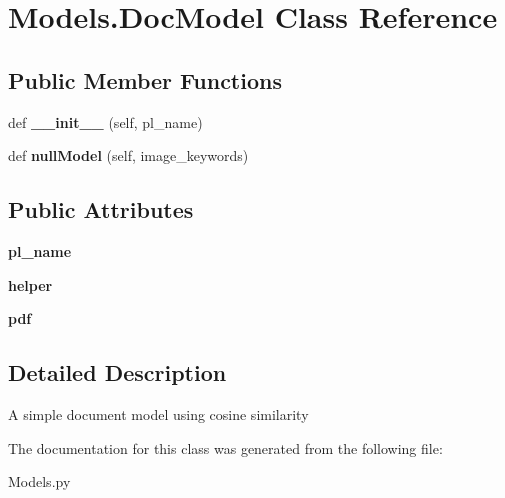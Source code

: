 \hypertarget{class_models_1_1_doc_model}{}\section{Models.\+Doc\+Model Class Reference}
\label{class_models_1_1_doc_model}
\subsection*{Public Member Functions}
\begin{DoxyCompactItemize}
\item 
\mbox{\label{class_models_1_1_doc_model_a815b36389f2510c727039d18018bf019}} 
def {\bfseries \+\_\+\+\_\+init\+\_\+\+\_\+} (self, pl\+\_\+name)
\item 
\mbox{\label{class_models_1_1_doc_model_aa831141041988e4198133d78cae4b63f}} 
def {\bfseries null\+Model} (self, image\+\_\+keywords)
\end{DoxyCompactItemize}
\subsection*{Public Attributes}
\begin{DoxyCompactItemize}
\item 
\mbox{\label{class_models_1_1_doc_model_a77226e7cae3c2e888dc67d32422cc16e}} 
{\bfseries pl\+\_\+name}
\item 
\mbox{\label{class_models_1_1_doc_model_a1418a45f9b85c736d4de162714ac5bd9}} 
{\bfseries helper}
\item 
\mbox{\label{class_models_1_1_doc_model_a2b61837ba19bf71ed9dcccb186d204e2}} 
{\bfseries pdf}
\end{DoxyCompactItemize}


\subsection{Detailed Description}
\begin{DoxyVerb}A simple document model using cosine similarity\end{DoxyVerb}
 

The documentation for this class was generated from the following file\+:\begin{DoxyCompactItemize}
\item 
Models.\+py\end{DoxyCompactItemize}
